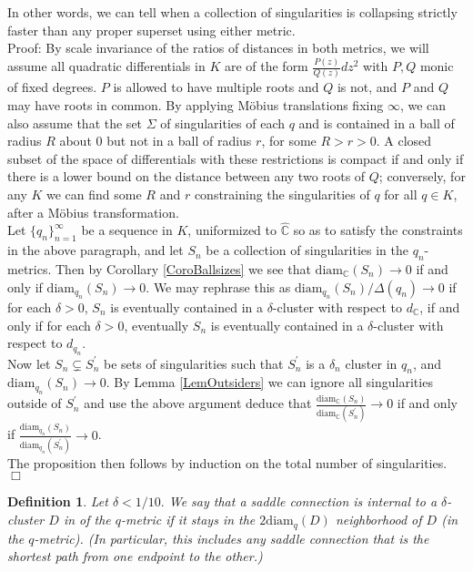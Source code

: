 \documentclass[12pt]{article}
\newtheorem{definition}[theorem]{Definition}
\newcommand{\cc}{\mathbb{C}}
\newcommand{\diam}{\mathrm{diam}}
\begin{document}
\noindent In other words, we can tell when a collection of singularities is collapsing strictly faster than any proper superset using either metric.\\

\noindent Proof: By scale invariance of the ratios of distances in both metrics, we will assume all quadratic differentials in $K$ are of the form $\frac{P(z)}{Q(z)}dz^2$ with $P,Q$ monic of fixed degrees. $P$ is allowed to have multiple roots and $Q$ is not, and $P$ and $Q$ may have roots in common. By applying M\"obius translations fixing $\infty$, we can also assume that the set $\Sigma$ of singularities of each $q$ and is contained in a ball of radius $R$ about $0$ but not in a ball of radius $r$, for some $R > r > 0$. A closed subset of the space of differentials with these restrictions is compact if and only if there is a lower bound on the distance between any two roots of $Q$; conversely, for any $K$ we can find some $R$ and $r$ constraining the singularities of $q$ for all $q \in K$, after a M\"obius transformation.\\

\noindent Let $\{q_n\}_{n = 1}^\infty$ be a sequence in $K$, uniformized to $\hat{\cc}$ so as to satisfy the constraints in the above paragraph, and let $S_n$ be a collection of singularities in the $q_n$-metrics. Then by Corollary \ref{CoroBallsizes} we see that $\diam_\cc(S_n) \to 0$ if and only if $\diam_{q_n}(S_n) \to 0$. We may rephrase this as $\diam_{q_n}(S_n)/\Delta(q_n) \to 0$ if for each $\delta > 0$, $S_n$ is eventually contained in a $\delta$-cluster with respect to $d_\cc$, if and only if for each $\delta > 0$, eventually $S_n$ is eventually contained in a $\delta$-cluster with respect to $d_{q_n}$.\\

\noindent Now let $S_n \subsetneq S_n^\prime$ be sets of singularities such that $S_n^\prime$ is a $\delta_n$ cluster in $q_n$, and $\diam_{q_n}(S_n) \to 0$. By Lemma \ref{LemOutsiders} we can ignore all singularities outside of $S_n^\prime$ and use the above argument deduce that $\frac{\diam_\cc(S_n)}{\diam_\cc(S_n^\prime)} \to 0$ if and only if $\frac{\diam_{q_n}(S_n)}{\diam_{q_n}(S_n^\prime)} \to 0$.\\

\noindent The proposition then follows by induction on the total number of singularities. $\Box$

\begin{definition}Let $\delta < 1/10.$ We say that a saddle connection is \emph{internal} to a $\delta$-cluster $D$ in of the $q$-metric if it stays in the $2\diam_q(D)$ neighborhood of $D$ (in the $q$-metric). (In particular, this includes any saddle connection that is the shortest path from one endpoint to the other.)\end{definition}
\end{document}
